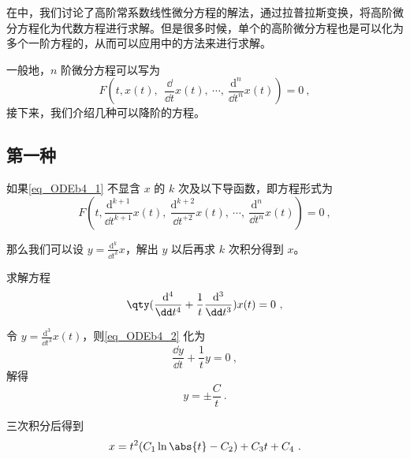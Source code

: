 

在中，我们讨论了高阶常系数线性微分方程的解法，通过拉普拉斯变换，将高阶微分方程化为代数方程进行求解。但是很多时候，单个的高阶微分方程也是可以化为多个一阶方程的，从而可以应用中的方法来进行求解。

一般地，$n$ 阶微分方程可以写为
\begin{equation}\label{eq_ODEb4_1}
F(t, x(t),\ \ \frac{\dd}{\dd t}x(t),\ \cdots, \ \frac{\mathrm{d}^n}{\dd t^n}x(t))=0~,
\end{equation}
接下来，我们介绍几种可以降阶的方程。

\subsection{第一种}

如果\autoref{eq_ODEb4_1} 不显含 $x$ 的 $k$ 次及以下导函数，即方程形式为
\begin{equation}
F(t, \frac{\mathrm{d}^{k+1}}{\dd t^{k+1}}x(t),\ \frac{\mathrm{d}^{k+2}}{\dd t^{+2}}x(t),\ \cdots,\ \frac{\mathrm{d}^n}{\dd t^n}x(t))=0~,
\end{equation}

那么我们可以设 $y=\frac{\mathrm{d}^k}{\dd t^k}x$，解出 $y$ 以后再求 $k$ 次积分得到 $x$。


\begin{example}{}
求解方程
\begin{equation}\label{eq_ODEb4_2}
\qty(
    \frac{\mathrm{d}^4}{\dd t^4}+\frac{1}{t}\frac{\mathrm{d}^3}{\dd t^3}
    )
    x(t)=0~,
\end{equation}

令 $y=\frac{\mathrm{d}^3}{\dd t^3}x(t)$，则\autoref{eq_ODEb4_2} 化为
\begin{equation}
\frac{\dd y}{\dd t}+\frac{1}{t}y=0~,
\end{equation}
解得
\begin{equation}
y=\pm\frac{C}{t}~.
\end{equation}

三次积分后得到
\begin{equation}
x=t^2(C_1\ln\abs{t}-C_2)+C_3t+C_4~.
\end{equation}



\end{example}


